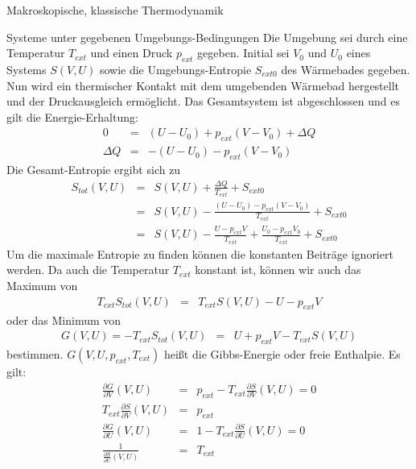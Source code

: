 \begin{chapter}{\titlestr}
\begin{section}{Makroskopische, klassische Thermodynamik}
\begin{subsection}{Systeme unter gegebenen Umgebungs-Bedingungen}
Die Umgebung sei durch eine Temperatur $T_{ext}$ und einen Druck $p_{ext}$ gegeben. Initial sei $V_0$ und $U_0$ eines Systems $S(V,U)$
sowie die Umgebungs-Entropie $S_{ext0}$ des Wärmebades gegeben. Nun wird ein thermischer Kontakt mit dem umgebenden Wärmebad hergestellt
und der Druckausgleich ermöglicht. Das Gesamtsystem ist abgeschlossen und es gilt die Energie-Erhaltung:
\begin{eqnarray*}
0 &=& (U-U_0)+p_{ext}(V-V_0)+\Delta Q\\
\Delta Q &=& -(U-U_0)-p_{ext}(V-V_0)
\end{eqnarray*}
Die Gesamt-Entropie ergibt sich zu
\begin{eqnarray*}
S_{tot}(V,U) &=& S(V,U)+\frac{\Delta Q}{T_{ext}}+S_{ext0}\\
&=& S(V,U)-\frac{(U-U_0)-p_{ext}(V-V_0)}{T_{ext}}+S_{ext0}\\
&=& S(V,U)-\frac{U-p_{ext}V}{T_{ext}}+\frac{U_0-p_{ext}V_0}{T_{ext}}+S_{ext0}
\end{eqnarray*}
Um die maximale Entropie zu finden können die konstanten Beiträge ignoriert werden. Da auch die Temperatur $T_{ext}$ konstant ist,
können wir auch das Maximum von
\begin{eqnarray*}
T_{ext}S_{tot}(V,U) &=& T_{ext}S(V,U)-U-p_{ext}V
\end{eqnarray*}
oder das Minimum von
\begin{eqnarray*}
G(V,U) = -T_{ext}S_{tot}(V,U) &=& U+p_{ext}V-T_{ext}S(V,U)
\end{eqnarray*}
bestimmen. $G(V,U,p_{ext},T_{ext})$ heißt die Gibbs-Energie oder freie Enthalpie.
Es gilt:
\begin{eqnarray*}
\frac{\partial G}{\partial V}(V,U) &=& p_{ext}-T_{ext}\frac{\partial S}{\partial V}(V,U) =0\\
T_{ext}\frac{\partial S}{\partial V}(V,U) &=& p_{ext}\\
\frac{\partial G}{\partial U}(V,U) &=& 1-T_{ext}\frac{\partial S}{\partial U}(V,U)=0\\
\frac{1}{\frac{\partial S}{\partial U}(V,U)} &=& T_{ext}
\end{eqnarray*}
\end{subsection}
\end{section}


\end{chapter}
